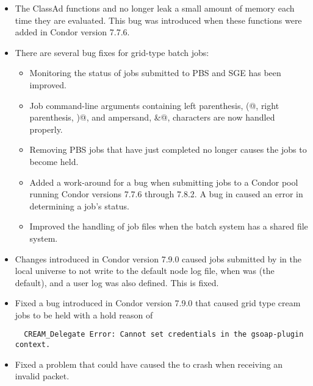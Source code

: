 \begin{itemize}
\item The ClassAd functions  and 
no longer leak a small amount of memory each time they are evaluated.  
This bug was introduced when these functions were added in Condor version 7.7.6.

\item There are several bug fixes for grid-type batch jobs:
  \begin{itemize}
  \item Monitoring the status of jobs submitted to PBS and SGE has been
    improved.   
  \item Job command-line arguments containing 
    left parenthesis, \verb@(@, right parenthesis, \verb@)@, 
    and ampersand, \verb@&@, characters are now handled properly. 
  \item Removing PBS jobs that have just completed no longer causes the jobs
    to become held. 
  \item Added a work-around for a bug when submitting jobs to
    a Condor pool running Condor versions 7.7.6 through 7.8.2.
    A bug in   caused an error in determining
    a job's status.
  \item Improved the handling of job files when the batch system has a shared
    file system. 
  \end{itemize}

\item Changes introduced in Condor version 7.9.0 caused jobs submitted by
 in the local universe to not write to the default node log file,
when  was  (the default),
and a user log was also defined. This is fixed. 

\item Fixed a bug introduced in Condor version 7.9.0 that caused grid type
cream jobs to be held with a hold reason of 
\footnotesize
\begin{verbatim}
  CREAM_Delegate Error: Cannot set credentials in the gsoap-plugin context.
\end{verbatim}
\normalsize
{}

\item Fixed a problem that could have caused the  to crash
when receiving an invalid packet.

\end{itemize}

